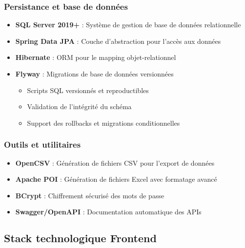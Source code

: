 \documentclass[12pt,a4paper]{report}
\begin{document}
\subsubsection{Persistance et base de données}
\begin{itemize}
\item \textbf{SQL Server 2019+} : Système de gestion de base de données relationnelle
\item \textbf{Spring Data JPA} : Couche d'abstraction pour l'accès aux données
\item \textbf{Hibernate} : ORM pour le mapping objet-relationnel
\item \textbf{Flyway} : Migrations de base de données versionnées
  \begin{itemize}
  \item Scripts SQL versionnés et reproductibles
  \item Validation de l'intégrité du schéma
  \item Support des rollbacks et migrations conditionnelles
  \end{itemize}
\end{itemize}

\subsubsection{Outils et utilitaires}
\begin{itemize}
\item \textbf{OpenCSV} : Génération de fichiers CSV pour l'export de données
\item \textbf{Apache POI} : Génération de fichiers Excel avec formatage avancé
\item \textbf{BCrypt} : Chiffrement sécurisé des mots de passe
\item \textbf{Swagger/OpenAPI} : Documentation automatique des APIs
\end{itemize}

\subsection{Stack technologique Frontend}
\end{document}
